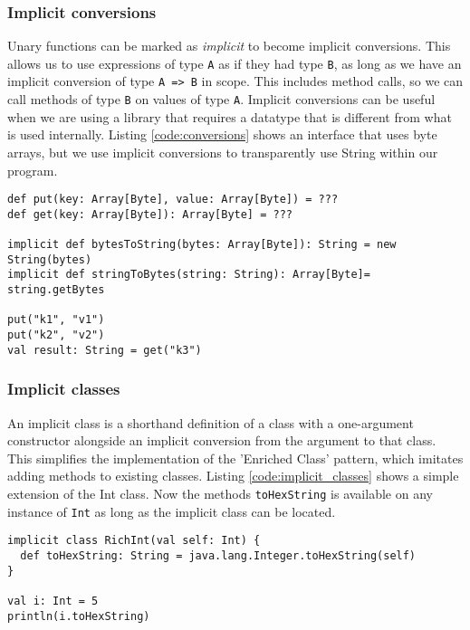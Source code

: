 \subsubsection{Implicit conversions}
Unary functions can be marked as {\it implicit} to become implicit conversions. This allows us to use expressions of type \texttt{A} as if they had type \texttt{B}, as long as we have an implicit conversion of type \texttt{A => B} in scope. This includes method calls, so we can call methods of type \texttt{B} on values of type \texttt{A}. Implicit conversions can be useful when we are using a library that requires a datatype that is different from what is used internally. Listing \ref{code:conversions} shows an interface that uses byte arrays, but we use implicit conversions to transparently use String within our program.

\begin{lstlisting}[caption=Implicit conversions, label=code:conversions, float]
def put(key: Array[Byte], value: Array[Byte]) = ???
def get(key: Array[Byte]): Array[Byte] = ???

implicit def bytesToString(bytes: Array[Byte]): String = new String(bytes)
implicit def stringToBytes(string: String): Array[Byte]= string.getBytes

put("k1", "v1")
put("k2", "v2")
val result: String = get("k3")
\end{lstlisting}

\subsubsection{Implicit classes}
An implicit class is a shorthand definition of a class with a one-argument constructor alongside an implicit conversion from the argument to that class. This simplifies the implementation of the 'Enriched Class' pattern, which imitates adding methods to existing classes. Listing \ref{code:implicit_classes} shows a simple extension of the Int class. Now the methods \texttt{toHexString} is available on any instance of \texttt{Int} as long as the implicit class can be located.

\begin{lstlisting}[caption=Implicit class, label=code:implicit_classes, float]
implicit class RichInt(val self: Int) {
  def toHexString: String = java.lang.Integer.toHexString(self)
}

val i: Int = 5
println(i.toHexString)
\end{lstlisting}

